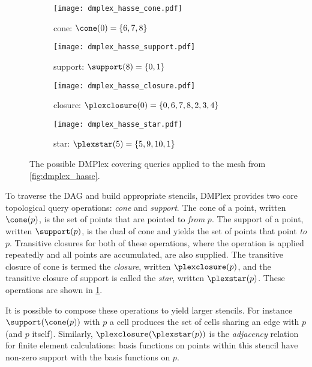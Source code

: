 \documentclass[thesis]{subfiles}
\begin{document}
\begin{figure}
  \centering
  \begin{subfigure}{.49\textwidth}
    \centering
    \texttt{[image: dmplex\_hasse\_cone.pdf]}
    \caption{cone: $\cone(0) = \{6,7,8\}$}
  \end{subfigure}
  \begin{subfigure}{.49\textwidth}
    \centering
    \texttt{[image: dmplex\_hasse\_support.pdf]}
    \caption{support: $\support(8) = \{0,1\}$}
  \end{subfigure}

  \vspace{1em}

  \begin{subfigure}{.49\textwidth}
    \centering
    \texttt{[image: dmplex\_hasse\_closure.pdf]}
    \caption{closure: $\plexclosure(0) = \{0,6,7,8,2,3,4\}$}
  \end{subfigure}
  \begin{subfigure}{.49\textwidth}
    \centering
    \texttt{[image: dmplex\_hasse\_star.pdf]}
    \caption{star: $\plexstar(5) = \{5,9,10,1\}$}
  \end{subfigure}

  \caption{
    The possible DMPlex covering queries applied to the mesh from \cref{fig:dmplex_hasse}.
  }
  \label{fig:dmplex_queries}
\end{figure}

To traverse the DAG and build appropriate stencils, DMPlex provides two core topological query operations: \emph{cone} and \emph{support}.
The cone of a point, written $\cone(p)$, is the set of points that are pointed to \emph{from} $p$.
The support of a point, written $\support(p)$, is the dual of cone and yields the set of points that point \emph{to} $p$.
Transitive closures for both of these operations, where the operation is applied repeatedly and all points are accumulated, are also supplied.
The transitive closure of cone is termed the \emph{closure}, written $\plexclosure(p)$, and the transitive closure of support is called the \emph{star}, written $\plexstar(p)$.
These operations are shown in \cref{fig:dmplex_queries}.

It is possible to compose these operations to yield larger stencils.
For instance $\support(\cone(p))$ with $p$ a cell produces the set of cells sharing an edge with $p$ (and $p$ itself).
Similarly, $\plexclosure(\plexstar(p))$ is the \textit{adjacency} relation for finite element calculations: basis functions on points within this stencil have non-zero support with the basis functions on $p$.
\end{document}
